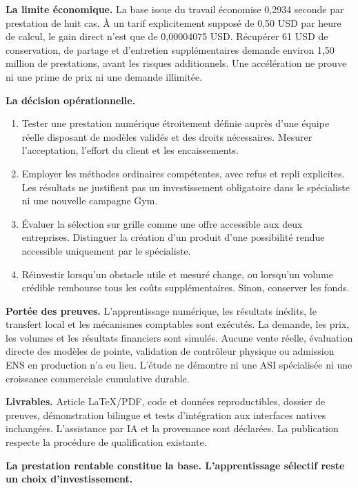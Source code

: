 \documentclass[10pt,letterpaper]{article}
\begin{document}
\textbf{La limite économique.} La base issue du travail économise 0,2934 seconde par prestation de huit cas. À un tarif explicitement supposé de 0,50 USD par heure de calcul, le gain direct n'est que de 0,00004075 USD. Récupérer 61 USD de conservation, de partage et d'entretien supplémentaires demande environ 1,50 million de prestations, avant les risques additionnels. Une accélération ne prouve ni une prime de prix ni une demande illimitée.

\textbf{La décision opérationnelle.}
\begin{enumerate}
\item Tester une prestation numérique étroitement définie auprès d'une équipe réelle disposant de modèles validés et des droits nécessaires. Mesurer l'acceptation, l'effort du client et les encaissements.
\item Employer les méthodes ordinaires compétentes, avec refus et repli explicites. Les résultats ne justifient pas un investissement obligatoire dans le spécialiste ni une nouvelle campagne Gym.
\item Évaluer la sélection sur grille comme une offre accessible aux deux entreprises. Distinguer la création d'un produit d'une possibilité rendue accessible uniquement par le spécialiste.
\item Réinvestir lorsqu'un obstacle utile et mesuré change, ou lorsqu'un volume crédible rembourse tous les coûts supplémentaires. Sinon, conserver les fonds.
\end{enumerate}

\textbf{Portée des preuves.} L'apprentissage numérique, les résultats inédits, le transfert local et les mécanismes comptables sont exécutés. La demande, les prix, les volumes et les résultats financiers sont simulés. Aucune vente réelle, évaluation directe des modèles de pointe, validation de contrôleur physique ou admission ENS en production n'a eu lieu. L'étude ne démontre ni une ASI spécialisée ni une croissance commerciale cumulative durable.

\textbf{Livrables.} Article LaTeX/PDF, code et données reproductibles, dossier de preuves, démonstration bilingue et tests d'intégration aux interfaces natives inchangées. L'assistance par IA et la provenance sont déclarées. La publication respecte la procédure de qualification existante.

\vfill
{\small\bfseries\color{navy}La prestation rentable constitue la base. L'apprentissage sélectif reste un choix d'investissement.}
\end{document}
